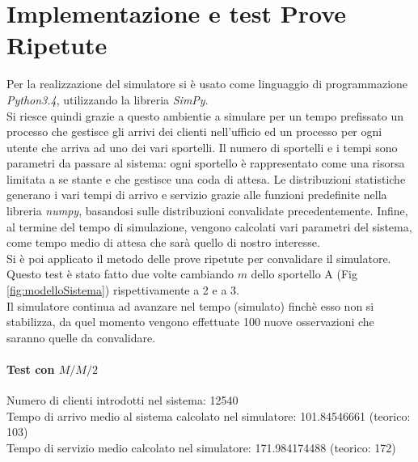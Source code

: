 \documentclass{article}
\begin{document}
\section{Implementazione e test Prove Ripetute}
Per la realizzazione del simulatore si è usato come linguaggio di programmazione \textit{Python3.4}, utilizzando la libreria \textit{SimPy}.\\
Si riesce quindi grazie a questo ambientie a simulare per un tempo prefissato un processo che gestisce gli arrivi dei clienti nell'ufficio ed un processo per ogni utente che arriva ad uno dei vari sportelli. Il numero di sportelli e i tempi sono parametri da passare al sistema: ogni sportello è rappresentato come una risorsa limitata a se stante e che gestisce una coda di attesa. Le distribuzioni statistiche generano i vari tempi di arrivo e servizio grazie alle funzioni predefinite nella libreria \textit{numpy}, basandosi sulle distribuzioni convalidate precedentemente. Infine, al termine del tempo di simulazione, vengono calcolati vari parametri del sistema, come tempo medio di attesa che sarà quello di nostro interesse.\\

Si è poi applicato il metodo delle prove ripetute per convalidare il simulatore.\\
Questo test è stato fatto due volte cambiando $m$ dello sportello A (Fig \ref{fig:modelloSistema}) rispettivamente a 2 e a 3.\\
Il simulatore continua ad avanzare nel tempo (simulato) finchè esso non si stabilizza, da quel momento vengono effettuate 100 nuove osservazioni che saranno quelle da convalidare.

\paragraph{Test con $M/M/2$}
Numero di clienti introdotti nel sistema: 12540\\
Tempo di arrivo medio al sistema calcolato nel simulatore: 101.84546661 (teorico: 103)\\
Tempo di servizio medio calcolato nel simulatore: 171.984174488 (teorico: 172)\\
\end{document}
